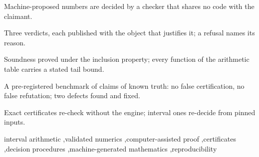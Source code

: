 \documentclass[preprint,11pt,a4paper]{elsarticle}
\theoremstyle{definition}
\begin{document}
\begin{frontmatter}
\begin{abstract}
Search programs, surrogate models and language models propose constants, counterexamples, fitted parameters and operating points faster than they can be refereed, each checked by its producer. We present cert-machine, a system that decides such claims independently of the claimant. \MtOutsideRerunsWordCap{} re-derivations by \MtOutsidePartiesWord{} outside parties, \MtOutsideOwnWord{} with their own code, reached its verdicts. A claim is read as a conjunction of inequalities over a declared input box, under a universal or an epistemic reading, and receives one of three verdicts---certified, refuted or refused---each published with the object that justifies it: a certificate, a falsifying input, or a refusal's reason and, for a declared parameter, the threshold that would change it. Verdicts are sound under the inclusion property, secured by exact rational and outward-rounded interval arithmetic with a stated tail bound for every function; classical certifiers reduce analytic questions to such decisions, and executable gates guard the code. On a pre-registered benchmark of \MtSaMutants{} claims of known truth, built by mutating published objects with exact witnesses from programs sharing no code with the deciders, the system produced \MtSaFalseCert{} false certifications and \MtSaFalseRef{} false refutations, and exposed two of its own defects, fixed on the record. Its interval kernel enclosed the exact value in all \MtArbCases{} comparisons with an independent library and in every enclosure case of the IEEE~1788 suite it implements; a $\delta$-complete decider agreed on every engineering claim and contradicted none. Applied to \RegRows{} machine-generated claims, it exposed gaps between what a producer's checker verified and what its output states.
\end{abstract}

\begin{highlights}
\item Machine-proposed numbers are decided by a checker that shares no code with the claimant.
\item Three verdicts, each published with the object that justifies it; a refusal names its reason.
\item Soundness proved under the inclusion property; every function of the arithmetic table carries a stated tail bound.
\item A pre-registered benchmark of \MtSaMutants{} claims of known truth: no false certification, no false refutation; two defects found and fixed.
\item Exact certificates re-check without the engine; interval ones re-decide from pinned inputs.
\end{highlights}

\begin{keyword}
interval arithmetic \sep validated numerics \sep computer-assisted proof \sep certificates \sep decision procedures \sep machine-generated mathematics \sep reproducibility
\end{keyword}

\end{frontmatter}
\end{document}
